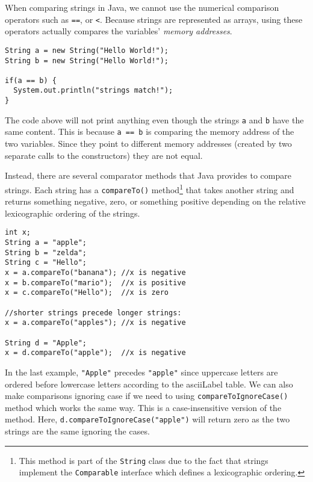When comparing strings in Java, we cannot use the 
numerical comparison operators such as \texttt{==}, or
\texttt{<}.  Because strings are represented as
arrays, using these operators actually compares the
variables' \emph{memory addresses}.

\begin{verbatim}
String a = new String("Hello World!");
String b = new String("Hello World!");

if(a == b) {
  System.out.println("strings match!");
}
\end{verbatim}

The code above will not print anything even though
the strings \texttt{a} and \texttt{b}
have the same content.  This is because \texttt{a == b}
is comparing the memory address of the two variables.
Since they point to different memory addresses 
(created by two separate calls to the constructors)
they are not equal.

Instead, there are several \gls{comparator} methods that 
Java provides to compare strings.  Each string has a
\texttt{compareTo()} method\footnote{This method
is part of the \texttt{String} class due to the
fact that strings implement the \texttt{Comparable}
interface which defines a lexicographic ordering.} that takes another
string and returns something negative, zero, or something
positive depending on the relative lexicographic ordering 
of the strings.

\begin{verbatim}
int x;
String a = "apple";
String b = "zelda";
String c = "Hello";
x = a.compareTo("banana"); //x is negative
x = b.compareTo("mario");  //x is positive
x = c.compareTo("Hello");  //x is zero

//shorter strings precede longer strings:
x = a.compareTo("apples"); //x is negative

String d = "Apple";
x = d.compareTo("apple");  //x is negative
\end{verbatim}

In the last example, \texttt{"Apple"} precedes
\texttt{"apple"} since uppercase letters are
ordered before lowercase letters according to the
\gls{asciiLabel} table.  We can also make comparisons
ignoring case if we need to using \texttt{compareToIgnoreCase()} method which works the same way.  This is a 
case-insensitive version of the method.  Here, 
\texttt{d.compareToIgnoreCase("apple")} will return 
zero as the two strings are the same ignoring the cases.

